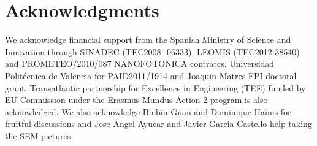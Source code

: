 \documentclass[journal]{IEEEtran}
\begin{document}
\section*{Acknowledgments}
We acknowledge financial support from the Spanish Ministry of Science and Innovation through  SINADEC (TEC2008- 06333), LEOMIS (TEC2012-38540) and PROMETEO/2010/087 NANOFOTONICA contratcs. Universidad Polit\'ecnica de Valencia for PAID2011/1914 and  Joaquin Matres FPI doctoral grant. Transatlantic partnership for Excellence in Engineering (TEE) funded by EU Commission under the Erasmus Mundus Action 2 program is also acknowledged.  We also acknowledge Binbin Guan and Dominique Hainis for fruitful discussions and Jose Angel Ayucar and Javier Garcia Castello help taking the SEM pictures.


% 
% 
\end{document}
